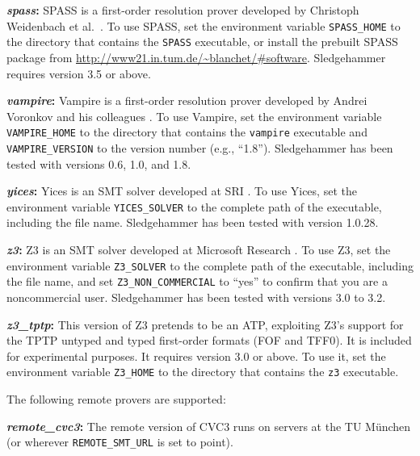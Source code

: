 \documentclass[a4paper,12pt]{article}
\newcommand\download{\url{http://www21.in.tum.de/~blanchet/\#software}}
\begin{document}
\begin{enum}
\begin{enum}
\item[\labelitemi] \textbf{\textit{spass}:} SPASS is a first-order resolution
prover developed by Christoph Weidenbach et al.\ \cite{weidenbach-et-al-2009}.
To use SPASS, set the environment variable \texttt{SPASS\_HOME} to the directory
that contains the \texttt{SPASS} executable, or install the prebuilt SPASS
package from \download. Sledgehammer requires version 3.5 or above.

\item[\labelitemi] \textbf{\textit{vampire}:} Vampire is a first-order resolution
prover developed by Andrei Voronkov and his colleagues
\cite{riazanov-voronkov-2002}. To use Vampire, set the environment variable
\texttt{VAMPIRE\_HOME} to the directory that contains the \texttt{vampire}
executable and \texttt{VAMPIRE\_VERSION} to the version number (e.g., ``1.8'').
Sledgehammer has been tested with versions 0.6, 1.0, and 1.8.

\item[\labelitemi] \textbf{\textit{yices}:} Yices is an SMT solver developed at
SRI \cite{yices}. To use Yices, set the environment variable
\texttt{YICES\_SOLVER} to the complete path of the executable, including the
file name. Sledgehammer has been tested with version 1.0.28.

\item[\labelitemi] \textbf{\textit{z3}:} Z3 is an SMT solver developed at
Microsoft Research \cite{z3}. To use Z3, set the environment variable
\texttt{Z3\_SOLVER} to the complete path of the executable, including the file
name, and set \texttt{Z3\_NON\_COMMERCIAL} to ``yes'' to confirm that you are a
noncommercial user. Sledgehammer has been tested with versions 3.0 to 3.2.

\item[\labelitemi] \textbf{\textit{z3\_tptp}:} This version of Z3 pretends to be
an ATP, exploiting Z3's support for the TPTP untyped and typed first-order
formats (FOF and TFF0). It is included for experimental purposes. It
requires version 3.0 or above. To use it, set the environment variable
\texttt{Z3\_HOME} to the directory that contains the \texttt{z3}
executable.
\end{enum}

The following remote provers are supported:

\begin{enum}
\item[\labelitemi] \textbf{\textit{remote\_cvc3}:} The remote version of CVC3 runs
on servers at the TU M\"unchen (or wherever \texttt{REMOTE\_SMT\_URL} is set to
point).


\end{enum}
\end{enum}
\end{document}
